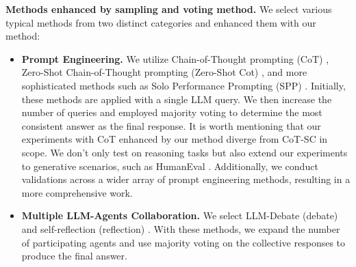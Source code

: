 \textbf{Methods enhanced by sampling and voting method.} We select various typical methods from two distinct categories and enhanced them with our method: 
\begin{itemize}
    \item \textbf{Prompt Engineering.} We utilize Chain-of-Thought prompting (CoT) \cite{cot}, Zero-Shot Chain-of-Thought prompting (Zero-Shot Cot) \cite{zs-cot}, and more sophisticated methods such as Solo Performance Prompting (SPP) \cite{spp}.  Initially, these methods are applied with a single LLM query. We then increase the number of queries and employed majority voting to determine the most consistent answer as the final response. It is worth mentioning that our experiments with CoT enhanced by our method diverge from CoT-SC \cite{cotsc} in scope. We don't only test on reasoning tasks but also extend our experiments to generative scenarios, such as HumanEval \cite{humaneval}. Additionally, we conduct validations across a wider array of prompt engineering methods, resulting in a more comprehensive work.
    \item \textbf{Multiple LLM-Agents Collaboration.} We select LLM-Debate (debate) \cite{debate} and self-reflection (reflection) \cite{reflexion}. With these methods, we expand the number of participating agents and use majority voting on the collective responses to produce the final answer.
\end{itemize}




